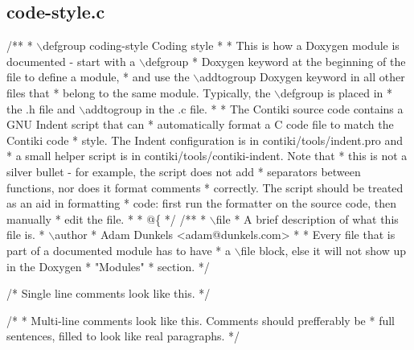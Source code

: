 \hypertarget{a00002}{}\subsection{code-\/style.\+c}

\begin{DoxyCodeInclude}
\textcolor{comment}{/**}
\textcolor{comment}{ * \(\backslash\)defgroup coding-style Coding style}
\textcolor{comment}{ *}
\textcolor{comment}{ * This is how a Doxygen module is documented - start with a \(\backslash\)defgroup}
\textcolor{comment}{ * Doxygen keyword at the beginning of the file to define a module,}
\textcolor{comment}{ * and use the \(\backslash\)addtogroup Doxygen keyword in all other files that}
\textcolor{comment}{ * belong to the same module. Typically, the \(\backslash\)defgroup is placed in}
\textcolor{comment}{ * the .h file and \(\backslash\)addtogroup in the .c file.}
\textcolor{comment}{ *}
\textcolor{comment}{ * The Contiki source code contains a GNU Indent script that can}
\textcolor{comment}{ * automatically format a C code file to match the Contiki code}
\textcolor{comment}{ * style. The Indent configuration is in contiki/tools/indent.pro and}
\textcolor{comment}{ * a small helper script is in contiki/tools/contiki-indent. Note that}
\textcolor{comment}{ * this is not a silver bullet - for example, the script does not add}
\textcolor{comment}{ * separators between functions, nor does it format comments}
\textcolor{comment}{ * correctly. The script should be treated as an aid in formatting}
\textcolor{comment}{ * code: first run the formatter on the source code, then manually}
\textcolor{comment}{ * edit the file.}
\textcolor{comment}{ *}
\textcolor{comment}{ * @\{}
\textcolor{comment}{ */}
\textcolor{comment}{}
\textcolor{comment}{/**}
\textcolor{comment}{ * \(\backslash\)file}
\textcolor{comment}{ *         A brief description of what this file is.}
\textcolor{comment}{ * \(\backslash\)author}
\textcolor{comment}{ *         Adam Dunkels <adam@dunkels.com>}
\textcolor{comment}{ *}
\textcolor{comment}{ *         Every file that is part of a documented module has to have}
\textcolor{comment}{ *         a \(\backslash\)file block, else it will not show up in the Doxygen}
\textcolor{comment}{ *         "Modules" * section.}
\textcolor{comment}{ */}

\textcolor{comment}{/* Single line comments look like this. */}

\textcolor{comment}{/*}
\textcolor{comment}{ * Multi-line comments look like this. Comments should prefferably be}
\textcolor{comment}{ * full sentences, filled to look like real paragraphs.}
\textcolor{comment}{ */}


\end{DoxyCodeInclude}
